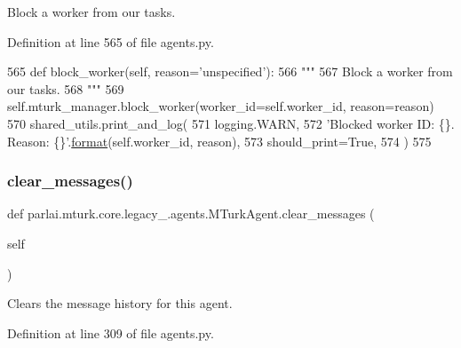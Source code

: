 \begin{DoxyVerb}Block a worker from our tasks.
\end{DoxyVerb}
 

Definition at line 565 of file agents.\+py.


\begin{DoxyCode}
565     \textcolor{keyword}{def }block\_worker(self, reason='unspecified'):
566         \textcolor{stringliteral}{"""}
567 \textcolor{stringliteral}{        Block a worker from our tasks.}
568 \textcolor{stringliteral}{        """}
569         self.mturk\_manager.block\_worker(worker\_id=self.worker\_id, reason=reason)
570         shared\_utils.print\_and\_log(
571             logging.WARN,
572             \textcolor{stringliteral}{'Blocked worker ID: \{\}. Reason: \{\}'}.\hyperlink{namespaceparlai_1_1chat__service_1_1services_1_1messenger_1_1shared__utils_a32e2e2022b824fbaf80c747160b52a76}{format}(self.worker\_id, reason),
573             should\_print=\textcolor{keyword}{True},
574         )
575 
\end{DoxyCode}
\mbox{\label{classparlai_1_1mturk_1_1core_1_1legacy__2018_1_1agents_1_1MTurkAgent_a2b5555ed1e85ef49d26d38b177052eb1}} 
\subsubsection{\texorpdfstring{clear\+\_\+messages()}{clear\_messages()}}
{\footnotesize\ttfamily def parlai.\+mturk.\+core.\+legacy\+\_.\+agents.\+M\+Turk\+Agent.\+clear\+\_\+messages (\begin{DoxyParamCaption}\item[{}]{self }\end{DoxyParamCaption})}

\begin{DoxyVerb}Clears the message history for this agent.
\end{DoxyVerb}
 

Definition at line 309 of file agents.\+py.


